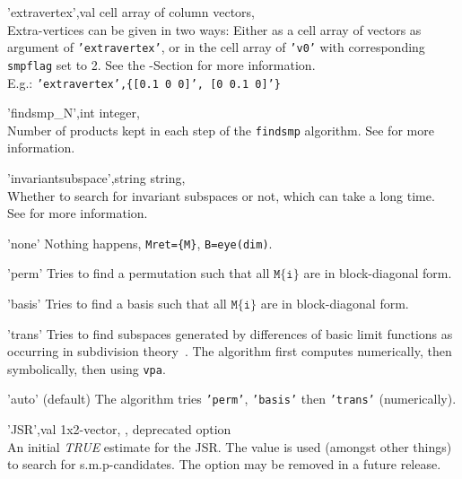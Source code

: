 \begin{param}
\item['extravertex',val] cell array of column vectors, \\Extra-vertices can be given in two ways: Either as a cell array of vectors as argument of \texttt{'extravertex'}, or in the cell array of \texttt{'v0'} with corresponding \texttt{smpflag} set to 2. See the -Section for more information.\\
E.g.: \texttt{'extravertex',\{[0.1 0 0]', [0 0.1 0]'\}}

\item['findsmp\_N',int] integer, \\Number of products kept in each step of the \texttt{findsmp} algorithm. See  for more information.

\item['invariantsubspace',string] string, \\  Whether to search for invariant subspaces or not, which can take a long time. \\See {} for more information.
    \begin{param}
    \item['none']      Nothing happens,  \texttt{Mret=\{M\}}, \texttt{B=eye(dim)}.

    \item['perm']      Tries to find a permutation such that all $\texttt{M\{i\}}$ are in block-diagonal form.
    \item['basis']     Tries to find a basis such that all $\texttt{M\{i\}}$ are in block-diagonal form.
    \item['trans']     Tries to find subspaces generated by differences of basic limit functions as occurring in subdivision theory~\cite{CP17}. The algorithm first computes numerically, then symbolically, then using \texttt{vpa}.
    \item['auto']      (default) The algorithm tries \texttt{'perm'}, \texttt{'basis'} then \texttt{'trans'} (numerically).
    \end{param}   

\item['JSR',val] 1x2-vector, , deprecated option\\ An initial \emph{TRUE} estimate for the JSR. The value is used (amongst other things) to search for s.m.p-candidates. The option may be removed in a future release.


\end{param}
